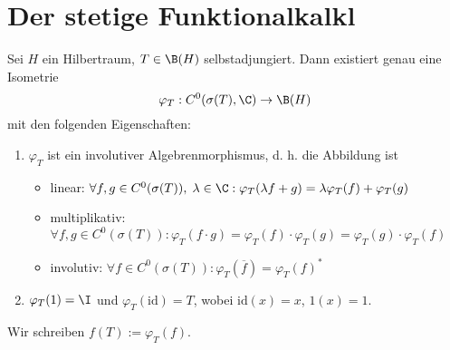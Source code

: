 \section{Der stetige Funktionalkalk\us l}
\begin{theorem}
	\label{stetiger_kalkuel}
	Sei $H$ ein Hilbertraum, \(T\in \B(H)\) selbstadjungiert. Dann existiert genau eine Isometrie 
	\[\varphi_T: C^0(\sigma(T),\C) \to \B(H)\]
	mit den folgenden Eigenschaften:
	\begin{enumerate}
		\item $\varphi_T$ ist ein involutiver Algebrenmorphismus, d. h. die Abbildung ist
		\begin{itemize}
		\item linear:\;\; \(\forall f, g \in C^0(\sigma(T)), \;\lambda \in \C: \varphi_T( \lambda f+g)  = \lambda \varphi_T(f) + \varphi_T(g)\)
		\item multiplikativ: \;\;\(\forall f, g \in C^0(\sigma(T)): \varphi_T(f\cdot g) = \varphi_T(f)\cdot\varphi_T(g) = \varphi_T(g) \cdot \varphi_T(f)\)
		\item involutiv: \;\; \(\forall f \in C^0(\sigma(T)): \varphi_T(\overline{f}) = \varphi_T(f)^*\)
		\end{itemize}
		\item \(\varphi_T(1) = \I\) und \(\varphi_T(\text{id}) = T\), wobei \(\text{id}(x) = x\), \(1(x) = 1\).
	\end{enumerate}
\end{theorem}

\begin{rem}
	Wir schreiben \(f(T) := \varphi_T(f)\).
\end{rem}

